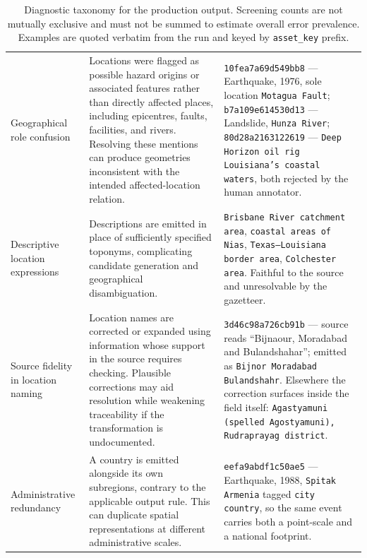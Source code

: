 \begin{table}[t]
\begin{tabularx}{\textwidth}{
@{}>{\raggedright\arraybackslash}p{}
>{\raggedright\arraybackslash}X
>{\raggedright\arraybackslash}p{}@{}}
Geographical role confusion &
Locations were flagged as possible hazard origins or associated features rather
than directly affected places, including epicentres, faults, facilities, and
rivers. Resolving these mentions can produce geometries inconsistent with the
intended affected-location relation. &
\texttt{10fea7a69d549bb8} --- Earthquake, 1976, sole location
\texttt{Motagua Fault}; \texttt{b7a109e614530d13} --- Landslide,
\texttt{Hunza River}; \texttt{80d28a2163122619} ---
\texttt{Deep Horizon oil rig \textbar{} Louisiana's coastal waters}, both
rejected by the human annotator. \\
\addlinespace

Descriptive location expressions &
Descriptions are emitted in place of sufficiently specified toponyms,
complicating candidate generation and geographical disambiguation. &
\texttt{Brisbane River catchment area}, \texttt{coastal areas of Nias},
\texttt{Texas--Louisiana border area}, \texttt{Colchester area}. Faithful to
the source and unresolvable by the gazetteer. \\
\addlinespace

Source fidelity in location naming &
Location names are corrected or expanded using information whose support in the
source requires checking. Plausible corrections may aid resolution while
weakening traceability if the transformation is undocumented. &
\texttt{3d46c98a726cb91b} --- source reads ``Bijnaour, Moradabad and
Bulandshahar''; emitted as
\texttt{Bijnor \textbar{} Moradabad \textbar{} Bulandshahr}. Elsewhere the
correction surfaces inside the field itself:
\texttt{Agastyamuni (spelled Agostyamuni), Rudraprayag district}. \\
\addlinespace

Administrative redundancy &
A country is emitted alongside its own subregions, contrary to the applicable
output rule. This can duplicate spatial representations at different
administrative scales. &
\texttt{eefa9abdf1c50ae5} --- Earthquake, 1988,
\texttt{Spitak \textbar{} Armenia} tagged \texttt{city \textbar{} country}, so
the same event carries both a point-scale and a national footprint. \\
\bottomrule
\end{tabularx}
\caption{Diagnostic taxonomy for the production output. Screening counts are
not mutually exclusive and must not be summed to estimate overall error
prevalence. Examples are quoted verbatim from the run and keyed by
\texttt{asset\_key} prefix.}
\label{tab:failure-taxonomy}
\end{table}
